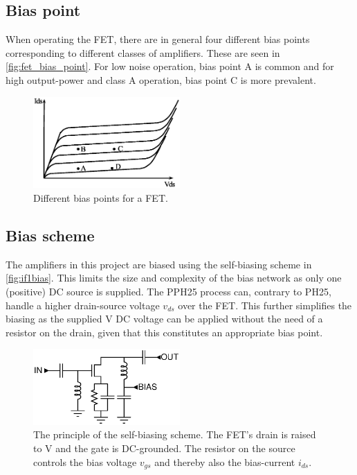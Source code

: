 		\subsection{Bias point}
			When operating the FET, there are in general four different bias points corresponding to different classes of amplifiers.\autocite{gonzalez84} These are seen in \autoref{fig:fet_bias_point}. For low noise operation, bias point A is common and for high output-power and class A operation, bias point C is more prevalent.

			\begin{figure}[hbt!]
				\centering
				\includegraphics[width=0.5\textwidth]{fig/amplifiers/fet_bias_point}
				\caption{Different bias points for a FET.}\label{fig:fet_bias_point}
			\end{figure}

		\subsection{Bias scheme}\label{sec:bias}
			The amplifiers in this project are biased using the self-biasing scheme in \autoref{fig:if1bias}.\autocite{bahl03} This limits the size and complexity of the bias network as only one (positive) DC source is supplied. The PPH25 process can, contrary to PH25,  handle a higher drain-source voltage $v_{ds}$ over the FET. This further simplifies the biasing as the supplied \unit[5]{V} DC voltage can be applied without the need of a resistor on the drain, given that this constitutes an appropriate bias point.

			\begin{figure}[hbt!]
				\centering
				\includegraphics[width=0.5\textwidth]{fig/amplifiers/if1/bias}
				\caption[Self-bias scheme.]{The principle of the self-biasing scheme. The FET's drain is raised to \unit[5]{V} and the gate is DC-grounded. The resistor on the source controls the bias voltage $v_{gs}$ and thereby also the bias-current $i_{ds}$.}\label{fig:if1bias}
			\end{figure}

